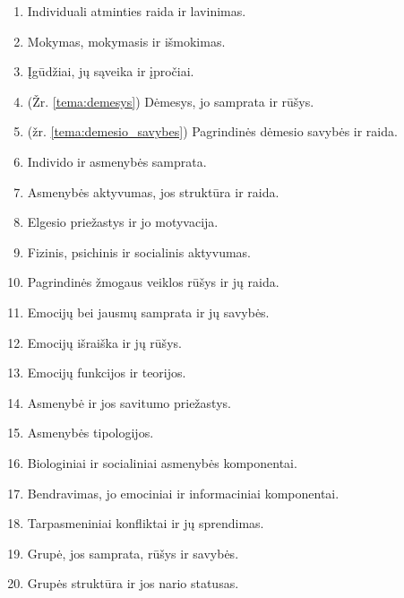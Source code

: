 \begin{enumerate}
  \item \label{tema_23} Individuali atminties raida ir lavinimas.
  \item \label{tema_24} Mokymas, mokymasis ir išmokimas.
  \item \label{tema_25} Įgūdžiai, jų sąveika ir įpročiai.
  \item \label{tema_26} (Žr. \ref{tema:demesys})
    Dėmesys, jo samprata ir rūšys.
  \item \label{tema_27} (žr. \ref{tema:demesio_savybes})
    Pagrindinės dėmesio savybės ir raida.
  \item \label{tema_30} Individo ir asmenybės samprata.
  \item \label{tema_31} Asmenybės aktyvumas, jos struktūra ir raida.
  \item \label{tema_32} Elgesio priežastys ir jo motyvacija.
  \item \label{tema_33} Fizinis, psichinis ir socialinis aktyvumas.
  \item \label{tema_34} Pagrindinės žmogaus veiklos rūšys ir jų raida.
  \item \label{tema_35} Emocijų bei jausmų samprata ir jų savybės.
  \item \label{tema_36} Emocijų išraiška ir jų rūšys.
  \item \label{tema_37} Emocijų funkcijos ir teorijos.
  \item \label{tema_40} Asmenybė ir jos savitumo priežastys.
  \item \label{tema_41} Asmenybės tipologijos.
  \item \label{tema_42} Biologiniai ir socialiniai asmenybės komponentai.
  \item \label{tema_43} Bendravimas, jo emociniai ir 
    informaciniai komponentai.
  \item \label{tema_44} Tarpasmeniniai konfliktai ir jų sprendimas.
  \item \label{tema_45} Grupė, jos samprata, rūšys ir savybės.
  \item \label{tema_46} Grupės struktūra ir jos nario statusas.
\end{enumerate}
